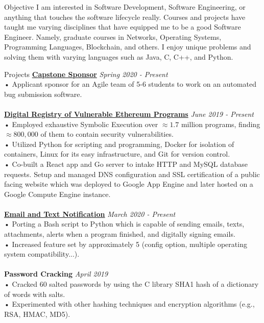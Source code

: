 \documentclass{resume} %
\begin{document}
\begin{rSection}{Objective}
  I am interested in Software Development, Software Engineering, or anything that touches the software lifecycle really. Courses and projects have taught me varying disciplines that have equipped me to be a good Software Engineer. Namely, graduate courses in Networks, Operating Systems, Programming Languages, Blockchain, and others. I enjoy unique problems and solving them with varying languages such as Java, C, C++, and Python.
\end{rSection}
\begin{rSection}{Projects}
  {\bf \href{https://docs.google.com/presentation/d/11ACdzalpubDKvJFnA6a\_5ST7Dd3P\_EbLrq1DEpJKloM/edit#slide=id.p}{Capstone Sponsor}} \hfill {\em{Spring 2020 - Present}}
  \\• Applicant sponsor for an Agile team of 5-6 students to work on an automated bug submission software.\\
    \\{\bf \href{https://www.haveibeenexploited.com/}{Digital Registry of Vulnerable Ethereum Programs}} \hfill {\em{June 2019 - Present}}
  \\• Employed exhaustive Symbolic Execution over $\approx1.7$ million programs, finding $\approx800,000$ of them to contain security vulnerabilities.
  \\• Utilized Python for scripting and programming, Docker for isolation of containers, Linux for its easy infrastructure, and Git for version control.
  \\• Co-built a React app and Go server to intake HTTP and MySQL database requests. Setup and managed DNS configuration and SSL certification of a public facing website which was deployed to Google App Engine and later hosted on a Google Compute Engine instance.\\
  \\{\bf \href{https://github.com/tdulcet/Send-Msg-CLI/tree/python-port}{Email and Text Notification}} \hfill {\em{March 2020 - Present}}
  \\• Porting a Bash script to Python which is capable of sending emails, texts, attachments, alerts when a program finished, and digitally signing emails.
  \\• Increased feature set by approximately 5 (config option, multiple operating system compatibility...).\\
  \\{\bf Password Cracking} \hfill {\em{April 2019}}
  \\• Cracked 60 salted passwords by using the C library SHA1 hash of a dictionary of words with salts.
  \\• Experimented with other hashing techniques and encryption algorithms (e.g., RSA, HMAC, MD5).

\end{rSection}
\end{document}
